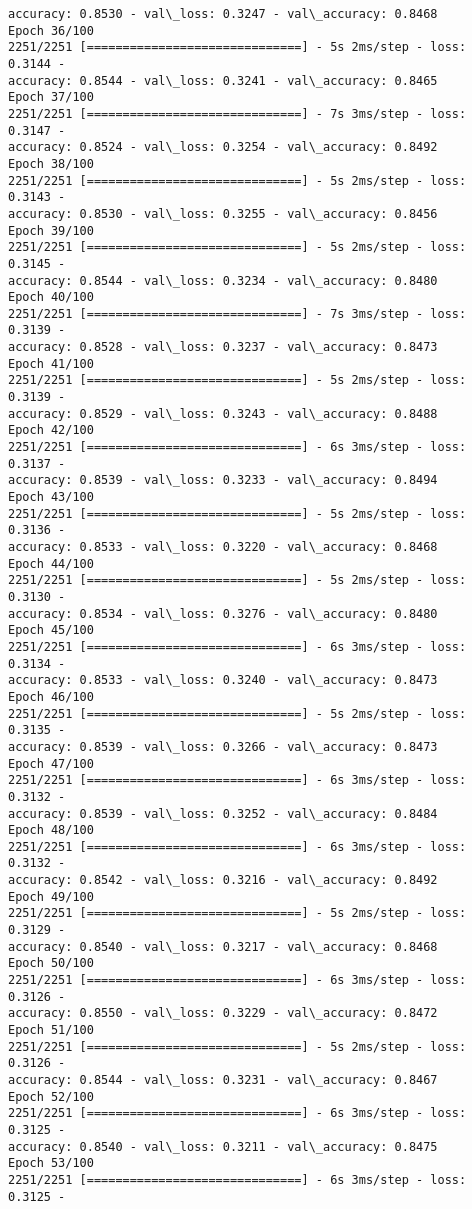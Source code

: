 \documentclass[11pt]{article}
\begin{document}
\begin{Verbatim}[commandchars=\\\{\}]
accuracy: 0.8530 - val\_loss: 0.3247 - val\_accuracy: 0.8468
Epoch 36/100
2251/2251 [==============================] - 5s 2ms/step - loss: 0.3144 -
accuracy: 0.8544 - val\_loss: 0.3241 - val\_accuracy: 0.8465
Epoch 37/100
2251/2251 [==============================] - 7s 3ms/step - loss: 0.3147 -
accuracy: 0.8524 - val\_loss: 0.3254 - val\_accuracy: 0.8492
Epoch 38/100
2251/2251 [==============================] - 5s 2ms/step - loss: 0.3143 -
accuracy: 0.8530 - val\_loss: 0.3255 - val\_accuracy: 0.8456
Epoch 39/100
2251/2251 [==============================] - 5s 2ms/step - loss: 0.3145 -
accuracy: 0.8544 - val\_loss: 0.3234 - val\_accuracy: 0.8480
Epoch 40/100
2251/2251 [==============================] - 7s 3ms/step - loss: 0.3139 -
accuracy: 0.8528 - val\_loss: 0.3237 - val\_accuracy: 0.8473
Epoch 41/100
2251/2251 [==============================] - 5s 2ms/step - loss: 0.3139 -
accuracy: 0.8529 - val\_loss: 0.3243 - val\_accuracy: 0.8488
Epoch 42/100
2251/2251 [==============================] - 6s 3ms/step - loss: 0.3137 -
accuracy: 0.8539 - val\_loss: 0.3233 - val\_accuracy: 0.8494
Epoch 43/100
2251/2251 [==============================] - 5s 2ms/step - loss: 0.3136 -
accuracy: 0.8533 - val\_loss: 0.3220 - val\_accuracy: 0.8468
Epoch 44/100
2251/2251 [==============================] - 5s 2ms/step - loss: 0.3130 -
accuracy: 0.8534 - val\_loss: 0.3276 - val\_accuracy: 0.8480
Epoch 45/100
2251/2251 [==============================] - 6s 3ms/step - loss: 0.3134 -
accuracy: 0.8533 - val\_loss: 0.3240 - val\_accuracy: 0.8473
Epoch 46/100
2251/2251 [==============================] - 5s 2ms/step - loss: 0.3135 -
accuracy: 0.8539 - val\_loss: 0.3266 - val\_accuracy: 0.8473
Epoch 47/100
2251/2251 [==============================] - 6s 3ms/step - loss: 0.3132 -
accuracy: 0.8539 - val\_loss: 0.3252 - val\_accuracy: 0.8484
Epoch 48/100
2251/2251 [==============================] - 6s 3ms/step - loss: 0.3132 -
accuracy: 0.8542 - val\_loss: 0.3216 - val\_accuracy: 0.8492
Epoch 49/100
2251/2251 [==============================] - 5s 2ms/step - loss: 0.3129 -
accuracy: 0.8540 - val\_loss: 0.3217 - val\_accuracy: 0.8468
Epoch 50/100
2251/2251 [==============================] - 6s 3ms/step - loss: 0.3126 -
accuracy: 0.8550 - val\_loss: 0.3229 - val\_accuracy: 0.8472
Epoch 51/100
2251/2251 [==============================] - 5s 2ms/step - loss: 0.3126 -
accuracy: 0.8544 - val\_loss: 0.3231 - val\_accuracy: 0.8467
Epoch 52/100
2251/2251 [==============================] - 6s 3ms/step - loss: 0.3125 -
accuracy: 0.8540 - val\_loss: 0.3211 - val\_accuracy: 0.8475
Epoch 53/100
2251/2251 [==============================] - 6s 3ms/step - loss: 0.3125 -

\end{Verbatim}
\end{document}
